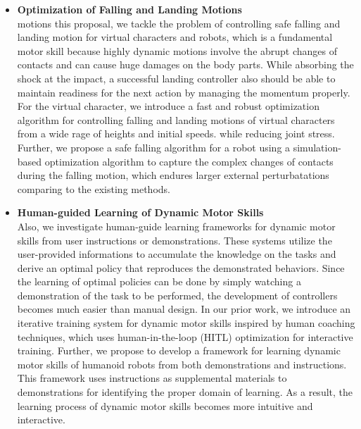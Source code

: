 \begin{itemize}
\item 
  \textbf{Optimization of Falling and Landing Motions}
  \\
  motions this proposal, we tackle the problem of controlling safe falling 
  and landing motion for virtual characters and robots, which is a fundamental
  motor skill because highly dynamic motions involve the abrupt changes
  of contacts and can cause huge damages on the body parts.
  While absorbing the shock at the impact, a successful landing controller 
  also should be able to maintain readiness for the next action by managing
  the momentum properly.
  For the virtual character, we introduce a fast and robust optimization 
  algorithm for controlling falling and landing motions of virtual
  characters from a wide rage of heights and initial speeds.
  while reducing joint stress.
  Further, we propose a safe falling algorithm for a robot using
  a simulation-based optimization algorithm to capture the complex
  changes of contacts during the falling motion, which endures larger 
  external perturbatations comparing to the existing methods.
\item 
  \textbf{Human-guided Learning of Dynamic Motor Skills}
  \\
  Also, we investigate human-guide learning frameworks for dynamic
  motor skills from user instructions or demonstrations.
  These systems utilize the user-provided informations to
  accumulate the knowledge on the tasks and derive
  an optimal policy that reproduces the demonstrated behaviors.
  Since the learning of optimal policies can be done by simply
  watching a demonstration of the task to be performed,
  the development of controllers becomes much easier 
  than manual design.
  In our prior work, we introduce an iterative training system for dynamic
  motor skills inspired by human coaching techniques, which uses 
  human-in-the-loop (HITL) optimization for interactive training.  
  Further, we propose to develop a framework for learning 
  dynamic motor skills of humanoid robots
  from both demonstrations and instructions.
  This framework uses instructions as supplemental
  materials to demonstrations for identifying the proper domain
  of learning.
  As a result, the learning process of dynamic motor skills 
  becomes more intuitive and interactive.

\end{itemize}

